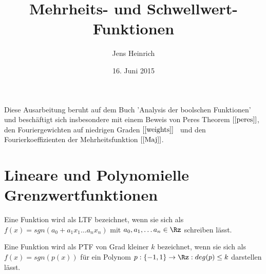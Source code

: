 \documentclass{article}
\title{Mehrheits- und Schwellwert-Funktionen}
\author{Jens Heinrich}
\date{16. Juni 2015}
\begin{document}
% 

 
	\maketitle
	\tableofcontents

\newpage
Diese Ausarbeitung beruht auf dem Buch 'Analysis der boolschen Funktionen' \cite{booleananalysis} und besch\"aftigt sich insbesondere mit einem Beweis von  {Peres Theorem } $\left[\ref{peres}\right] $, den Fouriergewichten auf niedrigen Graden $\left[\ref{weights}\right] $ \ und den Fourierkoeffizienten der Mehrheitsfunktion $\left[\ref{Maj}\right]$.

\section{Lineare und Polynomielle Grenzwertfunktionen}



		\begin{defn}
			Eine Funktion wird als LTF bezeichnet, wenn sie sich als $	f(x)= sgn (a_0+ a_1 x_1 \hdots a_n x_n) $	mit $a_0,a_1, \dots a_n \in \Rz$ schreiben l\"asst.
		\end{defn}
		 \begin{defn}
			 Eine Funktion wird als PTF von Grad kleiner $k$ bezeichnet, wenn sie sich als\\
				$ f(x)=sgn(p(x))$ f\"ur ein Polynom $p:\lbrace -1,1 \rbrace  \to \Rz :deg(p) \leq k $ darstellen l\"asst.
		 \end{defn}
		 
\end{document}
